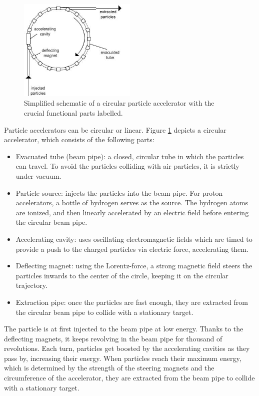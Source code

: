 \documentclass[12pt]{article}
\begin{document}
\begin{figure}[H]
	\begin{center}
		\includegraphics[width=0.5\textwidth]{particle_accelerator_schematic}
	\end{center}
	\caption[Circular particle accelerator structure]{Simplified schematic of a circular particle accelerator with the crucial functional parts labelled. \cite{accelerator_image_src_1}}
	\label{fig_part_accel_schematic}
\end{figure}

Particle accelerators can be circular or linear. Figure \ref{fig_part_accel_schematic} depicts a circular accelerator, which consists of the following parts:
\begin{itemize}
	\item Evacuated tube (beam pipe): a closed, circular tube in which the particles can travel. To avoid the particles colliding with air particles, it is strictly under vacuum.
	\item Particle source: injects the particles into the beam pipe. For proton accelerators, a bottle of hydrogen serves as the source. The hydrogen atoms are ionized, and then linearly accelerated by an electric field before entering the circular beam pipe.
	\item Accelerating cavity: uses oscillating electromagnetic fields which are timed to provide a push to the charged particles via electric force, accelerating them.
	\item Deflecting magnet: using the Lorentz-force, a strong magnetic field steers the particles inwards to the center of the circle, keeping it on the circular trajectory.
	\item Extraction pipe: once the particles are fast enough, they are extracted from the circular beam pipe to collide with a stationary target.
\end{itemize}

The particle is at first injected to the beam pipe at low energy. Thanks to the deflecting magnets, it keeps revolving in the beam pipe for thousand of revolutions. Each turn, particles get boosted by the accelerating cavities as they pass by, increasing their energy. When particles reach their maximum energy, which is determined by the strength of the steering magnets and the circumference of the accelerator, they are extracted from the beam pipe to collide with a stationary target.
\end{document}
